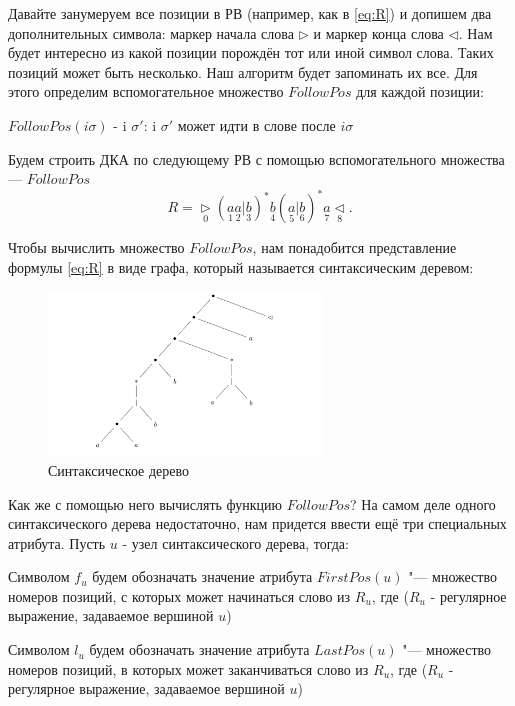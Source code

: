Давайте занумеруем все позиции в РВ (например, как в \eqref{eq:R}) и допишем два дополнительных символа: маркер начала слова $\rhd$ и маркер конца слова $\lhd$. Нам будет интересно из какой позиции порождён тот или иной символ слова. Таких позиций может быть несколько. Наш алгоритм будет запоминать их все. Для этого определим вспомогательное множество $FollowPos$ для каждой позиции:
\begin{Def}
    $FollowPos(i \sigma)$ - {i $\sigma'$: i $\sigma'$ может идти в слове после $i\sigma$}
\end{Def}


Будем строить ДКА по следующему РВ с помощью вспомогательного множества --- $FollowPos$
\begin{equation}\label{eq:R}
    R = \underset{0}{\rhd}(\underset{1}{a}\underset{2}{a}|\underset{3}{b})^{*}\underset{4}{b}(\underset{5}{a}|\underset{6}{b})^{*}\underset{7}{a}\underset{8}{\lhd}.
\end{equation}

Чтобы вычислить множество $FollowPos$, нам понадобится представление формулы \ref{eq:R} в виде графа, который называется синтаксическим деревом:


\begin{figure}[h!tp]
    \centering
    \includegraphics[width = 275px]{images/СинтаксическоеДерево.PNG}
    \caption{Синтаксическое дерево}
    \label{fig:SyntaxTree1}
\end{figure}

Как же с помощью него вычислять функцию $FollowPos$? На самом деле одного синтаксического дерева недостаточно, нам придется ввести ещё три специальных атрибута. Пусть $u$ - узел синтаксического дерева, тогда:
\begin{Def}Символом $f_{u}$ будем обозначать значение атрибута $FirstPos(u)$ "--- множество номеров позиций, с которых может начинаться слово из $R_u$, где ($R_u$ - регулярное выражение, задаваемое вершиной $u$) \end{Def}

\begin{Def}
    Символом $l_{u}$ будем обозначать значение атрибута $LastPos(u)$ "--- множество номеров позиций, в которых может заканчиваться слово из $R_u$, где ($R_u$ - регулярное выражение, задаваемое вершиной $u$)
\end{Def}

